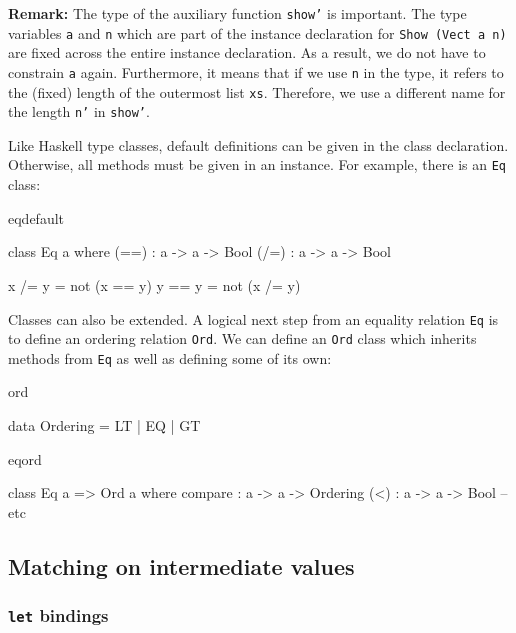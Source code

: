 \noindent
\textbf{Remark: } The type of the auxiliary function \texttt{show'} is
important. The type variables \texttt{a} and \texttt{n} which are part of the
instance declaration for \texttt{Show (Vect a n)} are fixed across the entire
instance declaration. As a result, we do not have to constrain \texttt{a}
again. Furthermore, it means that if we use \texttt{n} in the type, it refers
to the (fixed) length of the outermost list \texttt{xs}. Therefore,
we use a different name for the length \texttt{n'} in \texttt{show'}.

Like Haskell type classes, default definitions can be given in the class declaration.
Otherwise, all methods must be given in an instance. For example, there is an
\texttt{Eq} class:

\begin{SaveVerbatim}{eqdefault}

class Eq a where
    (==) : a -> a -> Bool
    (/=) : a -> a -> Bool

    x /= y = not (x == y)
    y == y = not (x /= y)

\end{SaveVerbatim}

\noindent
Classes can also be extended. A logical next step from an equality relation \texttt{Eq}
is to define an ordering relation \texttt{Ord}. We can define an \texttt{Ord} class
which inherits methods from \texttt{Eq} as well as defining some of its own:

\begin{SaveVerbatim}{ord}

data Ordering = LT | EQ | GT

\end{SaveVerbatim}

\begin{SaveVerbatim}{eqord}

class Eq a => Ord a where
    compare : a -> a -> Ordering
    (<) : a -> a -> Bool
    -- etc

\end{SaveVerbatim}

\subsection{Matching on intermediate values}

\subsubsection{\texttt{let} bindings}

